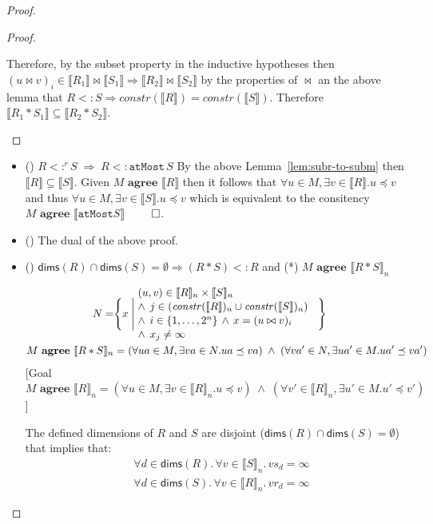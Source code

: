 \documentclass[10pt]{sigplanconf}
\theoremstyle{definition}
\newcommand{\interp}[1]{\llbracket{#1}\rrbracket}
\newcommand{\term}[1]{\texttt{#1}}
\newcommand{\effdims}[2]{\mathit{constr}(#1)_{#2}}
\newcommand{\consAName}{\textbf{agree}}
\newcommand{\consA}[2]{#1 \,\, \consAName{} \,\, #2}
\newcommand{\trule}[1]{{\footnotesize{(\text{#1})}}}
\begin{document}
\begin{proof}
\begin{proof}
\begin{itemize}
Therefore, by the subset property in the inductive hypotheses then
 $(u \bowtie v)_i \in \interp{R_1} \bowtie \interp{S_1} 
\Rightarrow \interp{R_2} \bowtie \interp{S_2}$ by the properties of
$\bowtie$ an the above lemma that $R <: S \Rightarrow \textit{constr}(\interp{R})
= \textit{constr}(\interp{S})$. Therefore
$\interp{R_1 \ast S_1} \subseteq \interp{R_2 \ast S_2}$.
\end{itemize}
\end{proof}

\begin{itemize}
\item \trule{\textsc{grow}} $R <:^r S \; \Rightarrow \; R <: \term{atMost} \,
  S$
By the above Lemma~\ref{lem:subr-to-subm} then $\interp{R} \subseteq
\interp{S}$. Given $\consA{M}{\interp{R}}$ then it follows
that $\forall u \in M, \exists v \in \interp{R} . u \preceq v$ and
thus $\forall u \in M, \exists v \in \interp{S} . u \preceq v$ which
is equivalent to the consitency
$\consA{M}{\interp{\term{atMost}{S}}}$ $\qed$.

\item \trule{\textsc{shrink}} The dual of the above proof.

\item \trule{\textsc{Gen$\ast$}} $\mathsf{dims}(R) \cap \mathsf{dims}(S) =
  \emptyset \Rightarrow (R \ast S) <: R$  and (*) $\consA{M}{\interp{R\ast S}_n}$

\begin{align*}
N = &   \Bigg\{x \; \Bigg| \;
    \parbox{5.9cm}{$(u, v) \in \interp{R}_n \times \interp{S}_n $ \\[0.1em]
                 $\;\; \wedge \;\, j \in (\effdims{\interp{R}}{n} \cup
                   \effdims{\interp{S}}{n})$\\[0.1em]
                  $\;\; \wedge \;\, i \in \{1, \ldots, 2^n\} \, \wedge
                  \, x = (u \bowtie v)_i$ \\[0.1em]
                   $\;\; \wedge \;\, x_j \neq \infty$
                  } \Bigg\} \\
\consA{M}{\interp{R\ast S}_n} & = (\forall ua \in M, \exists va \in N . ua
  \preceq va) \; \wedge \; (\forall va' \in N, \exists ua' \in M . ua' \preceq
    va')
\end{align*}
%
[Goal $\consA{M}{\interp{R}_n} = (\forall u \in M, \exists v \in \interp{R}_n . u
  \preceq v) \; \wedge \; (\forall v' \in \interp{R}_n, \exists u' \in M . u' \preceq
    v')$]

The defined dimensions of $R$ and $S$ are disjoint
($\mathsf{dims}(R) \cap \mathsf{dims}(S) =
  \emptyset$) that implies that:
%
\begin{align}
& \forall d \in \mathsf{dims}(R) . \, \forall v \in \interp{S}_n . \,
  vs_d = \infty \\
& \forall d \in \mathsf{dims}(S) . \, \forall v \in \interp{R}_n . \, 
  vr_d = \infty
\label{eq:sepa}
\end{align}


\end{itemize}
\end{proof}
\end{document}
